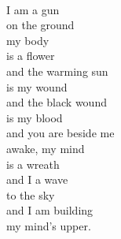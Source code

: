\documentclass[smalldemyvopaper,11pt,twoside,onecolumn,openright,extrafontsizes]{memoir}
\begin{document}
\\I am a gun
\\on the ground
\\my body
\\is a flower
\\and the warming sun
\\is my wound
\\and the black wound
\\is my blood
\\and you are beside me
\\awake, my mind
\\is a wreath
\\and I a wave
\\to the sky
\\and I am building
\\my mind's upper.
\end{document}
